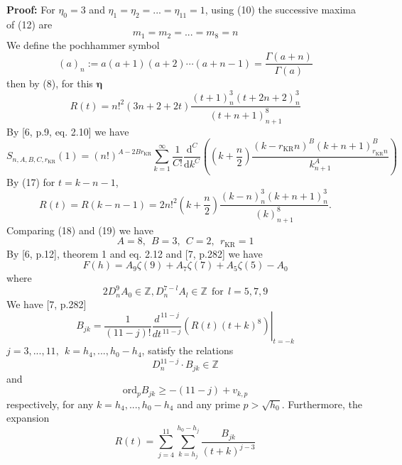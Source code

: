 \documentclass[12pt]{article}
\begin{document}
\begin{equation*}
\end{equation*}
\textbf{Proof:} For $\eta_0=3$ and $\eta_1=\eta_2=...=\eta_{11}=1$, using (10) the successive maxima of (12) are \begin{equation}
    m_1=m_2=...=m_8=n
\end{equation}
We define the pochhammer symbol $$(a)_n:=a(a+1)(a+2)\cdots(a+n-1)
=\frac{\Gamma(a+n)}{\Gamma(a)}$$ 
then by (8), for this $\boldsymbol{\eta}$ 
\begin{equation}
    R(t)=n!^2(3n+2+2t)\frac{(t+1)_n^3(t+2n+2)_n^3}{(t+n+1)^8_{n+1}}
\end{equation}
By [6, p.9, eq. 2.10] we have \begin{equation}
  S_{n,A,B,C,r_{\mathrm{KR}}}(1)=(n!)^{A-2Br_{\mathrm{KR}}}\sum_{k=1}^\infty \frac{1}{C!} \frac{\mathrm{d}^C}{\mathrm{d}k^C} \left(\left(k+\frac{n}{2}\right)\frac{(k-r_{\mathrm{KR}}n)^B(k+n+1)^B_{r_{\mathrm{KR}}n}}{k^A_{n+1}}\right)\end{equation}
By (17) for $t=k-n-1$,
\begin{equation}
R(t)=R(k-n-1)
=
2n!^2\left(k+\frac{n}{2}\right)
\frac{(k-n)_n^3(k+n+1)_n^3}{(k)_{n+1}^8}.
\end{equation}
Comparing (18) and (19) we have \begin{equation}
    A=8, \ \ B=3, \ \ C=2,\ \ r_{\mathrm{KR}}=1
\end{equation}
By [6, p.12], theorem 1 and eq. 2.12 and [7, p.282] we have \begin{equation}
    F(h)=A_9\zeta(9)+A_7\zeta(7)+A_5\zeta(5)-A_0
\end{equation} 
where \begin{equation}
    2D_n^9 A_0\in\mathbb{Z}, D_n^{7-l}A_l \in\mathbb{Z}\ \ \text{for}\ \ l=5,7,9 
\end{equation}
We have [7, p.282] \begin{equation}
B_{jk}
=
\frac{1}{(11-j)!}
\left.
\frac{d^{\,11-j}}{dt^{\,11-j}}
\left(R(t)(t+k)^8\right)
\right|_{t=-k}
\end{equation}
$j=3,...,11,\ \ k=h_4,...,h_0-h_4$, satisfy the relations \begin{equation}
    D_n^{11-j}\cdot B_{jk}\in\mathbb{Z}
\end{equation}
and \begin{equation}
    \text{ord}_p B_{jk}\geq -(11-j)+v_{k,p} 
\end{equation}
respectively, for any $k=h_4,...,h_0-h_4$ and any prime $p>\sqrt{h_0}$. Furthermore, the expansion \begin{equation}
    R(t)=\sum_{j=4}^{11}\sum_{k=h_j}^{h_0-h_j} \frac{B_{jk}}{(t+k)^{j-3}}
\end{equation} 
\end{document}
